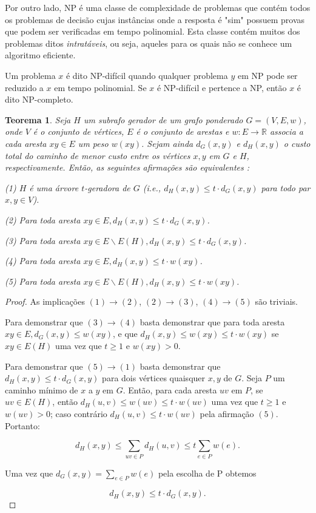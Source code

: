 \documentclass[article,a4paper,12pt,brazil,sumario=tradicional]{abntex2}
\newtheorem{theorem}{Teorema}
\theoremstyle{definition} %
\begin{document}
Por outro lado, NP é uma classe de complexidade de problemas que contém todos os problemas de decisão cujas instâncias onde a resposta é "sim" possuem provas que podem ser verificadas em tempo polinomial. Esta classe contém muitos dos problemas ditos \textit{intratáveis}, ou seja, aqueles para os quais não se conhece um algoritmo eficiente.

Um problema $x$ é dito NP-difícil quando qualquer problema $y$ em NP pode ser reduzido a $x$ em tempo polinomial. Se $x$ é NP-difícil e pertence a NP, então $x$ é dito NP-completo.

\begin{theorem}
Seja $H$ um subrafo gerador de um grafo ponderado  $G=(V,E,w)$, onde $V$ é o conjunto de vértices, $E$ é o conjunto de arestas e $w:E \rightarrow \mathbb{R}$ associa a cada aresta $xy \in E$ um peso $w(xy)$. Sejam ainda $d_G(x,y)$ e $d_H(x,y)$ o custo total do caminho de menor custo entre os vértices $x,y$ em $G$ e $H$, respectivamente. Então, as seguintes afirmações são equivalentes \cite{doi:10.1137/S0895480192237403}:

    (1) $H$ é uma árvore $t$-geradora de $G$ (i.e., $d_H(x,y) \leq t \cdot d_G(x,y)$ para todo par $x,y \in V$).

    (2) Para toda aresta $xy \in E, d_H(x,y) \leq t \cdot d_G(x,y)$.
    
    (3) Para toda aresta $xy \in E \backslash E(H), d_H(x,y) \leq t \cdot d_G(x,y)$.
    
    (4) Para toda aresta $xy \in E, d_H(x,y) \leq t \cdot w(xy)$.
    
    (5) Para toda aresta $xy \in E \backslash E(H), d_H(x,y) \leq t \cdot w(xy)$.

\end{theorem}

\begin{proof}
As implicações $(1) \rightarrow (2)$, $(2) \rightarrow (3)$, $(4) \rightarrow (5)$ são triviais.

Para demonstrar que $(3) \rightarrow (4)$ basta demonstrar que para toda aresta $xy \in E, d_G(x,y) \leq w(xy)$, e que $d_H(x,y) \leq w(xy) \leq t \cdot w(xy)$ se $xy \in E(H)$ uma vez que $t \geq 1$ e $w(xy) > 0$.

Para demonstrar que $(5) \rightarrow (1)$ basta demonstrar que $d_H(x,y) \leq t \cdot d_G(x,y)$ para dois vértices quaisquer $x, y$ de $G$. Seja $P$ um caminho mínimo de $x$ a $y$ em $G$. Então, para cada aresta $uv$ em $P$, se $uv \in E(H)$, então $d_H(u,v) \leq w(uv) \leq t \cdot w(uv)$ uma vez que $t \geq 1$ e $w(uv) > 0$; caso contrário $d_H(u,v) \leq t \cdot w(uv)$ pela afirmação $(5)$. Portanto:

\begin{equation*}
    d_H(x,y) \leq \sum_{uv \in P}d_H(u,v) \leq t \sum_{e \in P}w(e).
\end{equation*}

Uma vez que $d_G(x,y)= \sum_{e \in P}w(e)$ pela escolha de P obtemos

\begin{equation*}
    d_H(x,y) \leq t \cdot d_G(x,y).
\end{equation*}

\end{proof}
\end{document}
